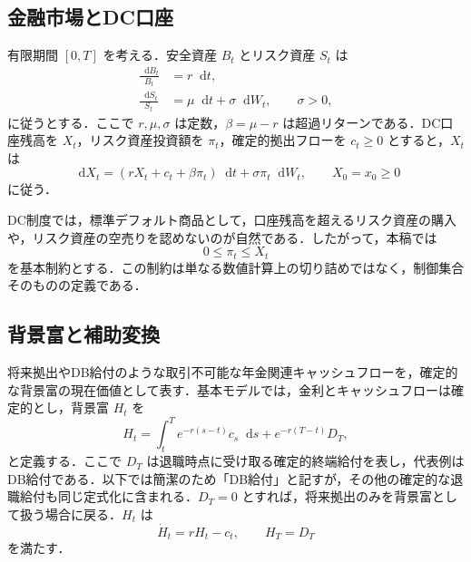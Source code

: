 \documentclass[10pt,a4paper]{article}
\theoremstyle{plain}
\theoremstyle{definition}
\newcommand{\dd}{\mathop{}\!\mathrm{d}}
\begin{document}
\subsection{金融市場とDC口座}

有限期間 $[0,T]$ を考える．安全資産 $B_t$ とリスク資産 $S_t$ は
\begin{align}
  \frac{\dd B_t}{B_t}&=r\dd t,\label{eq:riskless}\\
  \frac{\dd S_t}{S_t}&=\mu\dd t+\sigma\dd W_t,\qquad \sigma>0,\label{eq:risky}
\end{align}
に従うとする．ここで $r,\mu,\sigma$ は定数，$\beta=\mu-r$ は超過リターンである．DC口座残高を $X_t$，リスク資産投資額を $\pi_t$，確定的拠出フローを $c_t\geq0$ とすると，$X_t$ は
\begin{equation}
  \dd X_t=(rX_t+c_t+\beta\pi_t)\dd t+\sigma\pi_t\dd W_t,
  \qquad X_0=x_0\geq0
  \label{eq:X-dynamics}
\end{equation}
に従う．

DC制度では，標準デフォルト商品として，口座残高を超えるリスク資産の購入や，リスク資産の空売りを認めないのが自然である．したがって，本稿では
\begin{equation}
  0\leq\pi_t\leq X_t
  \label{eq:dc-constraint-x}
\end{equation}
を基本制約とする．この制約は単なる数値計算上の切り詰めではなく，制御集合そのものの定義である．

\subsection{背景富と補助変換}

将来拠出やDB給付のような取引不可能な年金関連キャッシュフローを，確定的な背景富の現在価値として表す．基本モデルでは，金利とキャッシュフローは確定的とし，背景富 $H_t$ を
\begin{equation}
  H_t=\int_t^T e^{-r(s-t)}c_s\dd s+e^{-r(T-t)}D_T,
  \label{eq:H-def}
\end{equation}
と定義する．ここで $D_T$ は退職時点に受け取る確定的終端給付を表し，代表例はDB給付である．以下では簡潔のため「DB給付」と記すが，その他の確定的な退職給付も同じ定式化に含まれる．$D_T=0$ とすれば，将来拠出のみを背景富として扱う場合に戻る．$H_t$ は
\begin{equation}
  \dot H_t=rH_t-c_t,
  \qquad H_T=D_T
  \label{eq:H-ode}
\end{equation}
を満たす．
\end{document}
